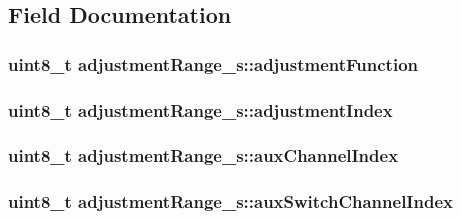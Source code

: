 \subsection{Field Documentation}
\hypertarget{structadjustmentRange__s_a30729c55c2a53bebef197cf6a7eb3ed1}{
\subsubsection[{adjustment\+Function}]{\setlength{\rightskip}{0pt plus 5cm}uint8\+\_\+t adjustment\+Range\+\_\+s\+::adjustment\+Function}}\label{structadjustmentRange__s_a30729c55c2a53bebef197cf6a7eb3ed1}
\hypertarget{structadjustmentRange__s_a8e3f033736377d8ece8c2ff8e672a175}{
\subsubsection[{adjustment\+Index}]{\setlength{\rightskip}{0pt plus 5cm}uint8\+\_\+t adjustment\+Range\+\_\+s\+::adjustment\+Index}}\label{structadjustmentRange__s_a8e3f033736377d8ece8c2ff8e672a175}
\hypertarget{structadjustmentRange__s_a5d212927ed80dc14968ad1d2b2467194}{
\subsubsection[{aux\+Channel\+Index}]{\setlength{\rightskip}{0pt plus 5cm}uint8\+\_\+t adjustment\+Range\+\_\+s\+::aux\+Channel\+Index}}\label{structadjustmentRange__s_a5d212927ed80dc14968ad1d2b2467194}
\hypertarget{structadjustmentRange__s_a8fe7fe6475972d4f299af01edef7be6e}{
\subsubsection[{aux\+Switch\+Channel\+Index}]{\setlength{\rightskip}{0pt plus 5cm}uint8\+\_\+t adjustment\+Range\+\_\+s\+::aux\+Switch\+Channel\+Index}}\label{structadjustmentRange__s_a8fe7fe6475972d4f299af01edef7be6e}
